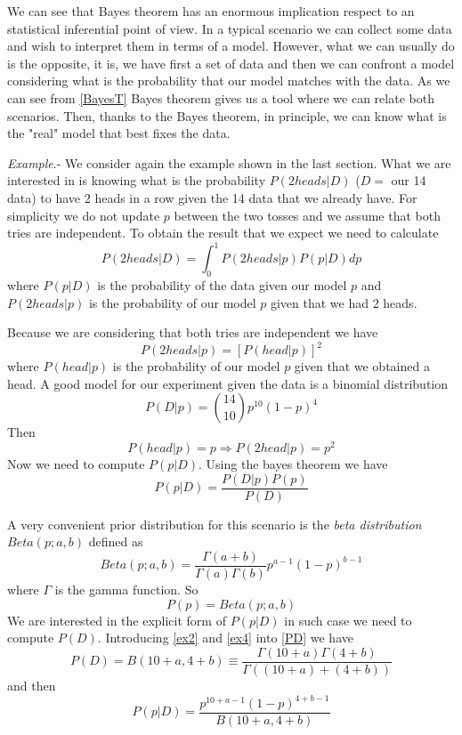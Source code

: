 \documentclass[onecolumn,           %
               showpacs,            %
               preprintnumbers,     %
               aps,                 %
               prl,          	    %
               letterpaper,             %
               superscriptaddress,      %
               nofootinbib,         %
               tightenlines,        %
               floats,floatfix      %
               ,usenatbib,
               ]{revtex4-1}
\begin{document}
We can see that Bayes theorem has an enormous implication respect to an statistical inferential point of view. In a typical scenario we can collect some data and wish to interpret them in terms of a model. However, what we can usually do is the opposite, it is, we have first a set of data and then we can confront a model considering what is the probability that our model matches with the data. As we can see from \eqref{BayesT} Bayes theorem gives us a tool where we can relate both scenarios. Then, thanks to the Bayes theorem, in principle, we can know what is the "real" model that best fixes the data. 

\textit{Example}.- We consider again the example shown in the last section. What we are interested in is knowing what is the probability $P(2heads|D)$ ($D=$ our 14 data) to have 2 heads in a row given the 14 data that we already have. For simplicity we do not update $p$ between the two tosses and we assume that both tries are independent. To obtain the result that we expect we need to calculate
\begin{equation}\label{ex}
P(2heads|D)=\int^1_0 P(2heads|p)P(p|D)dp
\end{equation}
where $P(p|D)$ is the probability of the data given our model $p$ and $P(2heads|p)$ is the probability of our model $p$ given that we had 2 heads. 

Because we are considering that both tries are independent we have
\begin{equation}
P(2heads|p)=[P(head|p)]^2
\end{equation}
where $P(head|p)$ is the probability of our model $p$ given that we obtained a head. A good model for our experiment given the data is a binomial distribution
\begin{equation}\label{ex2}
P(D|p)=\binom{14}{10}p^{10}(1-p)^4
\end{equation}
Then 
\begin{equation}\label{ex1}
P(head|p)=p\Rightarrow P(2head|p)=p^2
\end{equation}
Now we need to compute $P(p|D)$. Using the bayes theorem we have
\begin{equation}
P(p|D)=\frac{P(D|p)P(p)}{P(D)}
\end{equation}

A very convenient prior distribution for this scenario is the \textit{beta distribution} $Beta(p;a,b)$ defined as
\begin{equation}\label{ex3}
Beta(p;a,b)=\frac{\Gamma(a+b)}{\Gamma(a)\Gamma(b)}p^{a-1}(1-p)^{b-1}
\end{equation}
where $\Gamma$ is the gamma function. So
\begin{equation}\label{ex4}
P(p)=Beta(p;a,b)
\end{equation}
We are interested in the explicit form of $P(p|D)$ in such case we need to compute $P(D)$. Introducing \eqref{ex2} and \eqref{ex4} into \eqref{PD} we have
\begin{equation}
P(D)=B(10+a,4+b)\equiv \frac{\Gamma(10+a)\Gamma(4+b)}{\Gamma((10+a)+(4+b))}
\end{equation}
and then
\begin{equation}\label{ex4}
P(p|D)=\frac{p^{10+a-1}(1-p)^{4+b-1}}{B(10+a,4+b)}
\end{equation}
\end{document}
